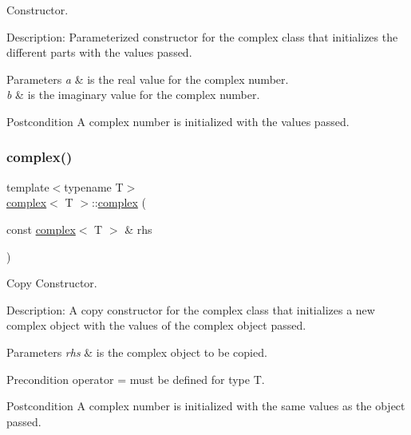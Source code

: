 Constructor. 

Description\+: Parameterized constructor for the complex class that initializes the different parts with the values passed. 
\begin{DoxyParams}{Parameters}
{\em a} & is the real value for the complex number. \\
\hline
{\em b} & is the imaginary value for the complex number. \\
\hline
\end{DoxyParams}
\begin{DoxyPostcond}{Postcondition}
A complex number is initialized with the values passed. 
\end{DoxyPostcond}
\mbox{\label{classcomplex_aca6c030056b5e089883c5e64a0309c28}} 
\subsubsection{\texorpdfstring{complex()}{complex()}\hspace{0.1cm}{\footnotesize\ttfamily [3/3]}}
{\footnotesize\ttfamily template$<$typename T$>$ \\
\hyperlink{classcomplex}{complex}$<$ T $>$\+::\hyperlink{classcomplex}{complex} (\begin{DoxyParamCaption}\item[{const \hyperlink{classcomplex}{complex}$<$ T $>$ \&}]{rhs }\end{DoxyParamCaption})}



Copy Constructor. 

Description\+: A copy constructor for the complex class that initializes a new complex object with the values of the complex object passed. 
\begin{DoxyParams}{Parameters}
{\em rhs} & is the complex object to be copied. \\
\hline
\end{DoxyParams}
\begin{DoxyPrecond}{Precondition}
operator = must be defined for type T. 
\end{DoxyPrecond}
\begin{DoxyPostcond}{Postcondition}
A complex number is initialized with the same values as the object passed. 
\end{DoxyPostcond}
\mbox{\label{classcomplex_a949d63a288cccf405266874f95357815}} 
